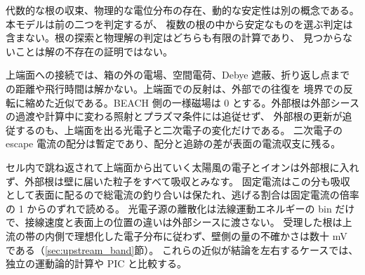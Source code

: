 代数的な根の収束、物理的な電位分布の存在、動的な安定性は別の概念である。本モデルは前の二つを判定するが、
複数の根の中から安定なものを選ぶ判定は含まない。根の探索と物理解の判定はどちらも有限の計算であり、
見つからないことは解の不存在の証明ではない。

上端面への接続では、箱の外の電場、空間電荷、Debye 遮蔽、折り返し点までの距離や飛行時間は解かない。上端面での反射は、外部での往復を
境界での反転に縮めた近似である。BEACH 側の一様磁場は 0 とする。外部根は外部シースの過渡や計算中に変わる照射とプラズマ条件には追従せず、
外部根の更新が追従するのも、上端面を出る光電子と二次電子の変化だけである。
二次電子の escape 電流の配分は暫定であり、配分と追跡の差が表面の電流収支に残る。

セル内で跳ね返されて上端面から出ていく太陽風の電子とイオンは外部根に入れず、外部根は壁に届いた粒子をすべて吸収とみなす。
固定電流はこの分も吸収として表面に配るので総電流の釣り合いは保たれ、逃げる割合は固定電流の倍率の 1 からのずれで読める。
光電子源の離散化は法線運動エネルギーの bin だけで、接線速度と表面上の位置の違いは外部シースに渡さない。
受理した根は上流の帯の内側で理想化した電子分布に従わず、壁側の量の不確かさは数十 mV である（\ref{sec:upstream_band}節）。
これらの近似が結論を左右するケースでは、独立の運動論的計算や PIC と比較する。
